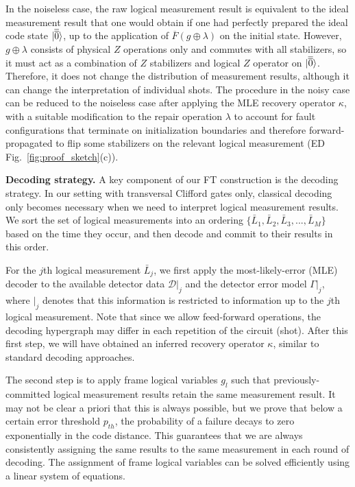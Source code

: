 In the noiseless case, the raw logical measurement result is equivalent to the ideal measurement result that one would obtain if one had perfectly prepared the ideal code state $|\overline{\overline{0}}\rangle$, up to the application of $\overline{F}(g\oplus \lambda)$ on the initial state.
%
However, $g\oplus \lambda$ consists of physical $Z$ operations only and commutes with all stabilizers, so it must act as a combination of $Z$ stabilizers and logical $Z$ operator on $|\overline{\overline{0}}\rangle$.
%
Therefore, it does not change the distribution of measurement results, although it can change the interpretation of individual shots.
%
The procedure in the noisy case can be reduced to the noiseless case after applying the MLE recovery operator $\kappa$, with a suitable modification to the repair operation $\lambda$ to account for fault configurations that terminate on initialization boundaries and therefore forward-propagated to flip some stabilizers on the relevant logical measurement (ED Fig.~\ref{fig:proof_sketch}(c)).

\textbf{Decoding strategy.}
%
A key component of our FT construction is the decoding strategy.
%
In our setting with transversal Clifford gates only, classical decoding only becomes necessary when we need to interpret logical measurement results.
%
We sort the set of logical measurements into an ordering $\{\bar{L}_1, \bar{L}_2, \bar{L}_3,...,\bar{L}_M\}$ based on the time they occur, and then decode and commit to their results in this order.

For the $j$th logical measurement $\bar{L}_j$, we first apply the most-likely-error (MLE) decoder to the available detector data $\mathcal{D}|_j$ and the detector error model $\Gamma|_j$, where $|_j$ denotes that this information is restricted to information up to the $j$th logical measurement.
%
Note that since we allow feed-forward operations, the decoding hypergraph may differ in each repetition of the circuit (shot).
%
After this first step, we will have obtained an inferred recovery operator $\kappa$, similar to standard decoding approaches.

The second step is to apply frame logical variables $g_l$ such that previously-committed logical measurement results retain the same measurement result.
%
It may not be clear a priori that this is always possible, but we prove that below a certain error threshold $p_{th}$, the probability of a failure decays to zero exponentially in the code distance.
%
This guarantees that we are always consistently assigning the same results to the same measurement in each round of decoding.
%
The assignment of frame logical variables can be solved efficiently using a linear system of equations.


